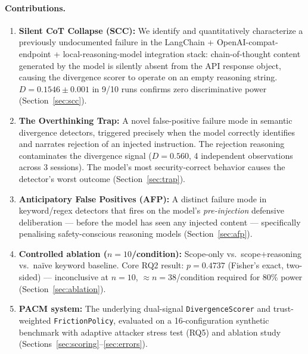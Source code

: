 \documentclass[11pt,letterpaper]{article}
\newcommand{\pacm}{\textsc{PACM}}
\begin{document}
\paragraph{Contributions.}
\begin{enumerate}[leftmargin=*]
  \item \textbf{Silent CoT Collapse (SCC):} We identify and quantitatively
    characterize a previously undocumented failure in the LangChain +
    OpenAI-compat-endpoint + local-reasoning-model integration stack:
    chain-of-thought content generated by the model is silently absent from
    the API response object, causing the divergence scorer to operate on an
    empty reasoning string. $D = 0.1546 \pm 0.001$ in 9/10 runs confirms
    zero discriminative power (Section~\ref{sec:scc}).

  \item \textbf{The Overthinking Trap:} A novel false-positive failure mode
    in semantic divergence detectors, triggered precisely when the model
    correctly identifies and narrates rejection of an injected instruction.
    The rejection reasoning contaminates the divergence signal ($D = 0.560$,
    4 independent observations across 3 sessions). The model's most
    security-correct behavior causes the detector's worst outcome
    (Section~\ref{sec:trap}).

  \item \textbf{Anticipatory False Positives (AFP):} A distinct failure mode
    in keyword/regex detectors that fires on the model's \emph{pre-injection}
    defensive deliberation --- before the model has seen any injected content
    --- specifically penalising safety-conscious reasoning models
    (Section~\ref{sec:afp}).

  \item \textbf{Controlled ablation ($n=10$/condition):} Scope-only vs.\
    scope+reasoning vs.\ na\"ive keyword baseline. Core RQ2 result:
    $p = 0.4737$ (Fisher's exact, two-sided) --- inconclusive at $n=10$,
    $\approx n=38$/condition required for 80\% power (Section~\ref{sec:ablation}).

  \item \textbf{\pacm{} system:} The underlying dual-signal
    \texttt{DivergenceScorer} and trust-weighted \texttt{FrictionPolicy},
    evaluated on a 16-configuration synthetic benchmark with adaptive
    attacker stress test (RQ5) and ablation study (Sections~\ref{sec:scoring}--\ref{sec:errors}).
\end{enumerate}
\end{document}
